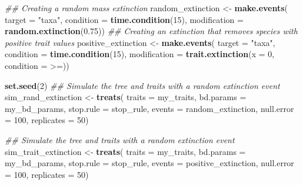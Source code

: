 \documentclass[
]{article}
\newenvironment{Shaded}{\begin{snugshade}}{\end{snugshade}}
\newcommand{\CommentTok}[1]{\textcolor[rgb]{0.56,0.35,0.01}{\textit{#1}}}
\newcommand{\DataTypeTok}[1]{\textcolor[rgb]{0.13,0.29,0.53}{#1}}
\newcommand{\DecValTok}[1]{\textcolor[rgb]{0.00,0.00,0.81}{#1}}
\newcommand{\FloatTok}[1]{\textcolor[rgb]{0.00,0.00,0.81}{#1}}
\newcommand{\KeywordTok}[1]{\textcolor[rgb]{0.13,0.29,0.53}{\textbf{#1}}}
\newcommand{\NormalTok}[1]{#1}
\newcommand{\StringTok}[1]{\textcolor[rgb]{0.31,0.60,0.02}{#1}}
\begin{document}
\begin{Shaded}
\begin{Highlighting}[]
\CommentTok{\#\# Creating a random mass extinction}
\NormalTok{random\_extinction \textless{}{-}}\StringTok{ }\KeywordTok{make.events}\NormalTok{(}
    \DataTypeTok{target       =} \StringTok{"taxa"}\NormalTok{,}
    \DataTypeTok{condition    =} \KeywordTok{time.condition}\NormalTok{(}\DecValTok{15}\NormalTok{),}
    \DataTypeTok{modification =} \KeywordTok{random.extinction}\NormalTok{(}\FloatTok{0.75}\NormalTok{))}
\CommentTok{\#\# Creating an extinction that removes species with positive trait values}
\NormalTok{positive\_extinction \textless{}{-}}\StringTok{ }\KeywordTok{make.events}\NormalTok{(}
    \DataTypeTok{target =} \StringTok{"taxa"}\NormalTok{,}
    \DataTypeTok{condition =} \KeywordTok{time.condition}\NormalTok{(}\DecValTok{15}\NormalTok{),}
    \DataTypeTok{modification =} \KeywordTok{trait.extinction}\NormalTok{(}\DataTypeTok{x =} \DecValTok{0}\NormalTok{, }\DataTypeTok{condition =} \StringTok{\textasciigrave{}}\DataTypeTok{\textgreater{}=}\StringTok{\textasciigrave{}}\NormalTok{))}

\KeywordTok{set.seed}\NormalTok{(}\DecValTok{2}\NormalTok{)}
\CommentTok{\#\# Simulate the tree and traits with a random extinction event}
\NormalTok{sim\_rand\_extinction \textless{}{-}}\StringTok{ }\KeywordTok{treats}\NormalTok{(}
                   \DataTypeTok{traits     =}\NormalTok{ my\_traits,}
                   \DataTypeTok{bd.params  =}\NormalTok{ my\_bd\_params,}
                   \DataTypeTok{stop.rule  =}\NormalTok{ stop\_rule,}
                   \DataTypeTok{events     =}\NormalTok{ random\_extinction,}
                   \DataTypeTok{null.error =} \DecValTok{100}\NormalTok{,}
                   \DataTypeTok{replicates =} \DecValTok{50}\NormalTok{)}

\CommentTok{\#\# Simulate the tree and traits with a random extinction event}
\NormalTok{sim\_trait\_extinction \textless{}{-}}\StringTok{ }\KeywordTok{treats}\NormalTok{(}
                   \DataTypeTok{traits     =}\NormalTok{ my\_traits,}
                   \DataTypeTok{bd.params  =}\NormalTok{ my\_bd\_params,}
                   \DataTypeTok{stop.rule  =}\NormalTok{ stop\_rule,}
                   \DataTypeTok{events     =}\NormalTok{ positive\_extinction,}
                   \DataTypeTok{null.error =} \DecValTok{100}\NormalTok{,}
                   \DataTypeTok{replicates =} \DecValTok{50}\NormalTok{)}
\end{Highlighting}
\end{Shaded}
\end{document}
